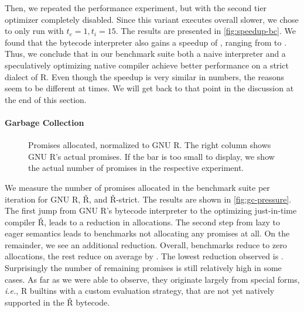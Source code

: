 \documentclass[review,nonacm,screen,acmsmall,anonymous=true]{acmart}
\renewcommand{\Rsh}{{\sf\v R}\xspace}
\newcommand{\ie}{\emph{i.e.},\xspace}
\begin{document}
Then, we repeated the performance experiment, but with the second tier
optimizer completely disabled. Since this variant executes overall \rshBCSlowdown
slower, we chose to only run with $t_e = 1, t_i = 15$.
The results are presented in \autoref{fig:speedup-bc}. We found that the bytecode
interpreter also gains a speedup of \speedupBCRshStrict, ranging from
\speedupBCRshStrictMin to \speedupBCRshStrictMax.
%
Thus, we conclude that in our benchmark suite both a naive interpreter and a speculatively
optimizing native compiler achieve better performance on a strict dialect of R.
Even though the speedup is very similar in numbers, the reasons seem to be
different at times. We will get back to that point in the discussion at the end of
this section.

\paragraph{Garbage Collection}

\begin{figure}[h]
  \centering
  
  \caption{Promises allocated, normalized to GNU R. The right column shows GNU R's actual promises. If the bar is too small to display, we show the actual number of promises in the respective experiment.}
  \label{fig:gc-pressure}
\end{figure}

We measure the number of promises allocated in the
benchmark suite per iteration for GNU R, \Rsh, and \Rsh-strict. The results are shown in
\autoref{fig:gc-pressure}. The first jump from GNU R's bytecode interpreter to
the optimizing just-in-time compiler \Rsh, leads to a \promiseAlocationReductionGnurRsh
reduction in allocations. The second step
from lazy to eager semantics leads to \promiseAlocationReductionRshStrictToZero
benchmarks not allocating any promises at all. On the remainder, we see an additional
\promiseAlocationReductionRshStrict reduction.
Overall, \promiseAlocationReductionRshStrictToZero benchmarks reduce to zero
allocations, the rest reduce on average by \promiseAlocationReductionGnurRshStrict.
The lowest reduction observed is
\promiseAlocationReductionGnurRshStrictMin.
Surprisingly the number of remaining promises is
still relatively high in some cases. As far as we were able to observe, they
originate largely from special forms, \ie R builtins with a custom evaluation
strategy, that are not yet natively supported in the \Rsh bytecode.
\end{document}
